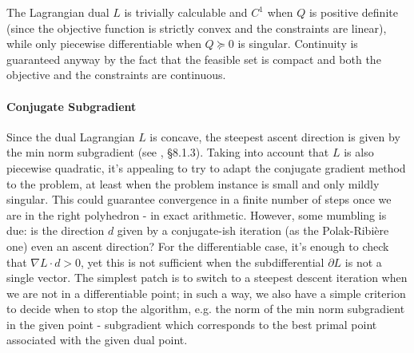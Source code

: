 \documentclass[10pt,twoside,book,a5paper]{ncc}
\begin{document}
The Lagrangian dual $L$ is trivially calculable and $C^1$ when $Q$ is positive definite (since the objective function is strictly convex and the constraints are linear), while only piecewise differentiable when $Q \succcurlyeq 0$ is singular. Continuity is guaranteed anyway by the fact that the feasible set is compact and both the objective and the constraints are continuous.

\paragraph{Conjugate Subgradient}
Since the dual Lagrangian $L$ is concave, the steepest ascent direction is given by the min norm subgradient (see \cite{BoydVanden}, §8.1.3). Taking into account that $L$ is also piecewise quadratic, it's appealing to try to adapt the conjugate gradient method to the problem, at least when the problem instance is small and only mildly singular. This could guarantee convergence in a finite number of steps once we are in the right polyhedron - in exact arithmetic. However, some mumbling is due: is the direction $d$  given by a conjugate-ish iteration (as the Polak-Ribière one) even an ascent direction? For the differentiable case, it's enough to check that $\nabla L\cdot d > 0$, yet this is not sufficient when the subdifferential $\partial L$ is not a single vector. The simplest patch is to switch to a steepest descent iteration when we are not in a differentiable point; in such a way, we also have a simple criterion to decide when to stop the algorithm, e.g. the norm of the min norm subgradient in the given point - subgradient which corresponds to the best primal point associated with the given dual point.
\end{document}
